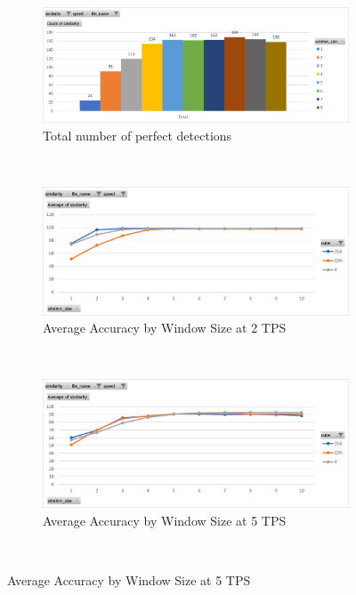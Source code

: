 \begin{figure}
    \caption{Perfect Detections by Window Size}
    \label{fig:influence-window-size}
    \begin{subfigure}{\textwidth}
        \centering
        \caption{Total number of perfect detections}
        \label{fig:perfect-detections-by-window-size-total}
        \includegraphics[width=\linewidth]{Figures/7 Evaluation/perfect_detections_by_window_size.png}
        \vspace*{.1mm}
    \end{subfigure}\\
    \begin{subfigure}{\textwidth}
        \centering
        \caption{Average Accuracy by Window Size at 2 TPS}
        \label{fig:influence-window-size-average-2tps}
        \includegraphics[width=\linewidth]{Figures/7 Evaluation/similarity_by_window_size_2tps.png}
        \vspace*{.1mm}
    \end{subfigure}\\
    \begin{subfigure}{\textwidth}
        \centering
        \caption{Average Accuracy by Window Size at 5 TPS}
        \label{fig:influence-window-size-average-5tps}
        \includegraphics[width=\linewidth]{Figures/7 Evaluation/similarity_by_window_size_5tps.png}
        \vspace*{.1mm}
    \end{subfigure}\\
\end{figure}


